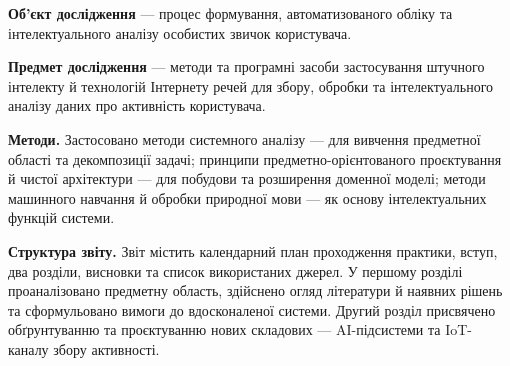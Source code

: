 \textbf{Об'єкт дослідження} — процес формування, автоматизованого обліку та інтелектуального
аналізу особистих звичок користувача.

\textbf{Предмет дослідження} — методи та програмні засоби застосування штучного інтелекту й
технологій Інтернету речей для збору, обробки та інтелектуального аналізу даних про активність
користувача.

\textbf{Методи.} Застосовано методи системного аналізу — для вивчення предметної області та
декомпозиції задачі; принципи предметно-орієнтованого проєктування й чистої архітектури — для
побудови та розширення доменної моделі; методи машинного навчання й обробки природної мови — як
основу інтелектуальних функцій системи.

\textbf{Структура звіту.} Звіт містить календарний план проходження практики, вступ, два
розділи, висновки та список використаних джерел. У першому розділі проаналізовано предметну
область, здійснено огляд літератури й наявних рішень та сформульовано вимоги до вдосконаленої
системи. Другий розділ присвячено обґрунтуванню та проєктуванню нових складових — AI-підсистеми
та IoT-каналу збору активності.
